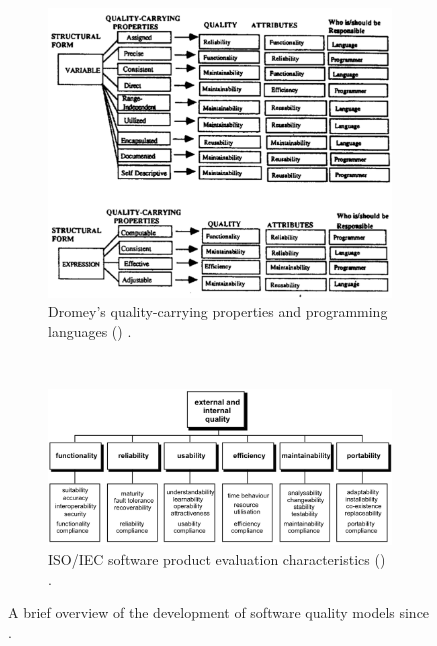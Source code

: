 \begin{figure}[h!]
  ~
  \begin{subfigure}[t]{0.49\linewidth}
    \centering
    \includegraphics[width=0.8\linewidth]{dromey-quality-carrying-properites}
    \caption{Dromey's quality-carrying properties and programming languages (\citeyear{Dromey:1995wy}) \citep{Dromey:1995wy}.}
    \label{fig:background:software-quality:quality-models:development:dromey}
  \end{subfigure}
  ~
  \begin{subfigure}[t]{0.49\linewidth}
    \centering
    \includegraphics[width=\linewidth]{iso-software-product-evaluation-characteristics}
    \caption{ISO/IEC software product evaluation characteristics (\citeyear{ISO9126:1999}) \citep{ISO9126:1999}.}
    \label{fig:background:software-quality:quality-models:development:iso}
  \end{subfigure}
  \caption[Overview of software quality models]{A brief overview of the development of software quality models since \citeyear{McCall:1977wm}.}
  \label{fig:background:software-quality:quality-models:development}
\end{figure}